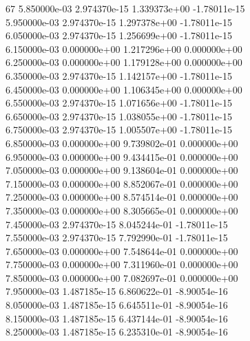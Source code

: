 67	5.850000e-03	2.974370e-15	1.339373e+00	-1.78011e-15	\\ 	5.950000e-03	2.974370e-15	1.297378e+00	-1.78011e-15	\\ 	6.050000e-03	2.974370e-15	1.256699e+00	-1.78011e-15	\\ 	6.150000e-03	0.000000e+00	1.217296e+00	0.000000e+00	\\ 	6.250000e-03	0.000000e+00	1.179128e+00	0.000000e+00	\\ 	6.350000e-03	2.974370e-15	1.142157e+00	-1.78011e-15	\\ 	6.450000e-03	0.000000e+00	1.106345e+00	0.000000e+00	\\ 	6.550000e-03	2.974370e-15	1.071656e+00	-1.78011e-15	\\ 	6.650000e-03	2.974370e-15	1.038055e+00	-1.78011e-15	\\ 	6.750000e-03	2.974370e-15	1.005507e+00	-1.78011e-15	\\ 	6.850000e-03	0.000000e+00	9.739802e-01	0.000000e+00	\\ 	6.950000e-03	0.000000e+00	9.434415e-01	0.000000e+00	\\ 	7.050000e-03	0.000000e+00	9.138604e-01	0.000000e+00	\\ 	7.150000e-03	0.000000e+00	8.852067e-01	0.000000e+00	\\ 	7.250000e-03	0.000000e+00	8.574514e-01	0.000000e+00	\\ 	7.350000e-03	0.000000e+00	8.305665e-01	0.000000e+00	\\ 	7.450000e-03	2.974370e-15	8.045244e-01	-1.78011e-15	\\ 	7.550000e-03	2.974370e-15	7.792990e-01	-1.78011e-15	\\ 	7.650000e-03	0.000000e+00	7.548644e-01	0.000000e+00	\\ 	7.750000e-03	0.000000e+00	7.311960e-01	0.000000e+00	\\ 	7.850000e-03	0.000000e+00	7.082697e-01	0.000000e+00	\\ 	7.950000e-03	1.487185e-15	6.860622e-01	-8.90054e-16	\\ 	8.050000e-03	1.487185e-15	6.645511e-01	-8.90054e-16	\\ 	8.150000e-03	1.487185e-15	6.437144e-01	-8.90054e-16	\\ 	8.250000e-03	1.487185e-15	6.235310e-01	-8.90054e-16	\\ \hline
